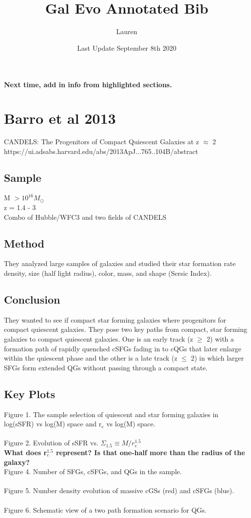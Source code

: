 \documentclass{article}
\title{Gal Evo Annotated Bib}
\author{Lauren}
\date{Last Update September 8th 2020}
\begin{document}
\maketitle

\textbf{Next time, add in info from highlighted sections.}

\section{Barro et al 2013}

CANDELS: The Progenitors of Compact Quiescent Galaxies at z $\approx$ 2\\
https://ui.adsabs.harvard.edu/abs/2013ApJ...765..104B/abstract

\subsection{Sample}
M $> 10^{16} M_{\odot}$ \\
z = 1.4 - 3 \\
Combo of Hubble/WFC3 and two fields of CANDELS 

\subsection{Method}
They analyzed large samples of galaxies and studied their star formation rate density, size (half 
light radius), color, mass, and shape (Sersic Index). 

\subsection{Conclusion}
They wanted to see if compact star forming 
galaxies where progenitors for compact quiescent galaxies. They pose two key paths from compact, star
forming galaxies to compact quiescent galaxies. One is an early track (z $\geq$ 2) with a 
formation path of rapidly quenched cSFGs fading in to cQGs that later enlarge within the quiescent 
phase and the other is a late track (z $\leq$ 2) in which larger SFGs form extended QGs without 
passing through a compact state.

\subsection{Key Plots}
Figure 1. The sample selection of quiescent and star forming galaxies in log(sSFR) vs log(M) space and r$_{e}$ vs log(M) space. \\
\\
Figure 2. Evolution of sSFR vs. $\Sigma_{1.5} \equiv M/r_{e}^{1.5}$ \\
\textbf{What does r$_{e}^{1.5}$ represent? Is that one-half more than the radius of the galaxy?} 
\\
Figure 4. Number of SFGs, cSFGs, and QGs in the sample. \\
\\
Figure 5. Number density evolution of massive cGSs (red) and cSFGs (blue).\\
\\
Figure 6. Schematic view of a two path formation scenario for QGs.
\end{document}
